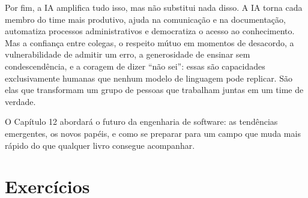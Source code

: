 Por fim, a IA amplifica tudo isso, mas não substitui nada disso. A IA
torna cada membro do time mais produtivo, ajuda na comunicação e na
documentação, automatiza processos administrativos e democratiza o acesso
ao conhecimento. Mas a confiança entre colegas, o respeito mútuo em
momentos de desacordo, a vulnerabilidade de admitir um erro, a generosidade
de ensinar sem condescendência, e a coragem de dizer ``não sei'': essas
são capacidades exclusivamente humanas que nenhum modelo de linguagem pode
replicar. São elas que transformam um grupo de pessoas que trabalham juntas
em um time de verdade.

O Capítulo 12 abordará o futuro da engenharia de software: as tendências
emergentes, os novos papéis, e como se preparar para um campo que muda mais
rápido do que qualquer livro consegue acompanhar.

\section*{Exercícios}

